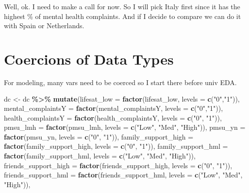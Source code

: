 \documentclass[
]{article}
\newenvironment{Shaded}{\begin{snugshade}}{\end{snugshade}}
\newcommand{\AttributeTok}[1]{\textcolor[rgb]{0.13,0.29,0.53}{#1}}
\newcommand{\FunctionTok}[1]{\textcolor[rgb]{0.13,0.29,0.53}{\textbf{#1}}}
\newcommand{\NormalTok}[1]{#1}
\newcommand{\OtherTok}[1]{\textcolor[rgb]{0.56,0.35,0.01}{#1}}
\newcommand{\SpecialCharTok}[1]{\textcolor[rgb]{0.81,0.36,0.00}{\textbf{#1}}}
\newcommand{\StringTok}[1]{\textcolor[rgb]{0.31,0.60,0.02}{#1}}
\begin{document}
Well, ok. I need to make a call for now. So I will pick Italy first
since it has the highest \% of mental health complaints. And if I decide
to compare we can do it with Spain or Netherlands.

\section{Coercions of Data Types}\label{coercions-of-data-types}

For modeling, many vars need to be coerced so I start there before univ
EDA.

\begin{Shaded}
\begin{Highlighting}[]
\NormalTok{dc }\OtherTok{\textless{}{-}}\NormalTok{ dc }\SpecialCharTok{\%\textgreater{}\%}
  \FunctionTok{mutate}\NormalTok{(}\AttributeTok{lifesat\_low =} \FunctionTok{factor}\NormalTok{(lifesat\_low, }\AttributeTok{levels =} \FunctionTok{c}\NormalTok{(}\StringTok{"0"}\NormalTok{,}\StringTok{"1"}\NormalTok{)),}
         \AttributeTok{mental\_complaintsY =} \FunctionTok{factor}\NormalTok{(mental\_complaintsY, }\AttributeTok{levels =} \FunctionTok{c}\NormalTok{(}\StringTok{"0"}\NormalTok{,}\StringTok{"1"}\NormalTok{)),}
         \AttributeTok{health\_complaintsY =} \FunctionTok{factor}\NormalTok{(health\_complaintsY, }\AttributeTok{levels =} \FunctionTok{c}\NormalTok{(}\StringTok{"0"}\NormalTok{, }\StringTok{"1"}\NormalTok{)),}
         \AttributeTok{pmsu\_lmh =} \FunctionTok{factor}\NormalTok{(pmsu\_lmh, }\AttributeTok{levels =} \FunctionTok{c}\NormalTok{(}\StringTok{"Low"}\NormalTok{, }\StringTok{"Med"}\NormalTok{, }\StringTok{"High"}\NormalTok{)),}
         \AttributeTok{pmsu\_yn =} \FunctionTok{factor}\NormalTok{(pmsu\_yn, }\AttributeTok{levels =} \FunctionTok{c}\NormalTok{(}\StringTok{"0"}\NormalTok{, }\StringTok{"1"}\NormalTok{)),}
         \AttributeTok{family\_support\_high =} \FunctionTok{factor}\NormalTok{(family\_support\_high, }\AttributeTok{levels =} \FunctionTok{c}\NormalTok{(}\StringTok{"0"}\NormalTok{, }\StringTok{"1"}\NormalTok{)),}
         \AttributeTok{family\_support\_hml =} \FunctionTok{factor}\NormalTok{(family\_support\_hml, }\AttributeTok{levels =} \FunctionTok{c}\NormalTok{(}\StringTok{"Low"}\NormalTok{, }\StringTok{"Med"}\NormalTok{, }\StringTok{"High"}\NormalTok{)),}
         \AttributeTok{friends\_support\_high =} \FunctionTok{factor}\NormalTok{(friends\_support\_high, }\AttributeTok{levels =} \FunctionTok{c}\NormalTok{(}\StringTok{"0"}\NormalTok{, }\StringTok{"1"}\NormalTok{)),}
         \AttributeTok{friends\_support\_hml =} \FunctionTok{factor}\NormalTok{(friends\_support\_hml, }\AttributeTok{levels =} \FunctionTok{c}\NormalTok{(}\StringTok{"Low"}\NormalTok{, }\StringTok{"Med"}\NormalTok{, }\StringTok{"High"}\NormalTok{)),}

\end{Highlighting}
\end{Shaded}
\end{document}
